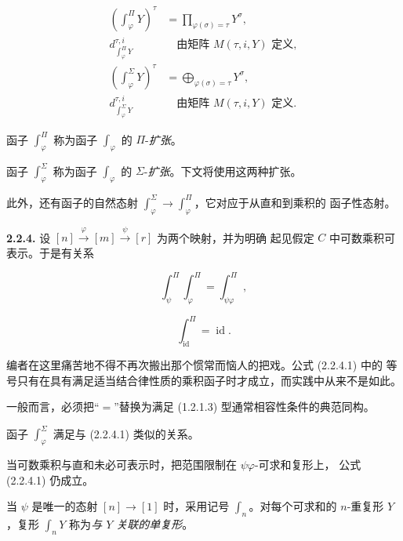 \clearpage
{}%
%

\begin{equation}
  \begin{aligned}
    \left(\int_{\varphi}^{\Pi}Y\right)^{\tau}
      &=\prod_{\varphi(\sigma)=\tau}Y^{\sigma},\\
    d_{\int_{\varphi}^{\Pi}Y}^{\tau,i}
      &\quad\text{由矩阵 }M(\tau,i,Y)\text{ 定义},\\[2pt]
    \left(\int_{\varphi}^{\Sigma}Y\right)^{\tau}
      &=\bigoplus_{\varphi(\sigma)=\tau}Y^{\sigma},\\
    d_{\int_{\varphi}^{\Sigma}Y}^{\tau,i}
      &\quad\text{由矩阵 }M(\tau,i,Y)\text{ 定义}.
  \end{aligned}
  \tag{2.2.3.3}
\end{equation}

函子 $\int_{\varphi}^{\Pi}$ 称为函子 $\int_\varphi$ 的
$\Pi$-\emph{扩张}。

函子 $\int_{\varphi}^{\Sigma}$ 称为函子 $\int_\varphi$ 的
$\Sigma$-\emph{扩张}。下文将使用这两种扩张。

此外，还有函子的自然态射
$\int_{\varphi}^{\Sigma}\to\int_{\varphi}^{\Pi}$，它对应于从直和到乘积的
函子性态射。

\noindent\textbf{2.2.4.}\quad
设 $[n]\xrightarrow{\varphi}[m]\xrightarrow{\psi}[r]$ 为两个映射，并为明确
起见假定 $C$ 中可数乘积可表示。于是有关系

\begin{equation}
  \int_{\psi}^{\Pi}\int_{\varphi}^{\Pi}
  =\int_{\psi\varphi}^{\Pi},
  \tag{2.2.4.1}
\end{equation}

\begin{equation}
  \int_{\operatorname{id}}^{\Pi}=\operatorname{id}.
  \tag{2.2.4.2}
\end{equation}

编者在这里痛苦地不得不再次搬出那个惯常而恼人的把戏。公式 (2.2.4.1) 中的
等号只有在具有满足适当结合律性质的乘积函子时才成立，而实践中从来不是如此。

一般而言，必须把“$=$”替换为满足 (1.2.1.3) 型通常相容性条件的典范同构。

函子 $\int_{\varphi}^{\Sigma}$ 满足与 (2.2.4.1) 类似的关系。

当可数乘积与直和未必可表示时，把范围限制在 $\psi\varphi$-可求和复形上，
公式 (2.2.4.1) 仍成立。

当 $\psi$ 是唯一的态射 $[n]\to[1]$ 时，采用记号 $\int_n$。对每个可求和的
$n$-重复形 $Y$，复形 $\int_nY$ 称为\emph{与 $Y$ 关联的单复形}。
